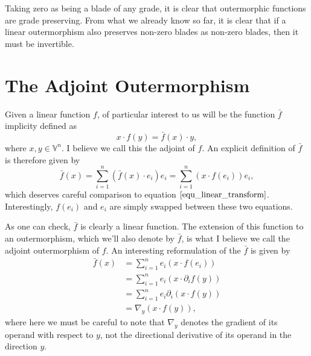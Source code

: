 \documentclass[12pt]{article}
\newcommand{\V}{\mathbb{V}}
\newcommand{\of}{\bar{f}}
\begin{document}
Taking zero as being a blade of any grade, it is clear that outermorphic functions are
grade preserving.  From what we already know so far, it is clear that if a linear outermorphism
also preserves non-zero blades as non-zero blades, then it must be invertible.

\section{The Adjoint Outermorphism}

Given a linear function $f$, of particular
interest to us will be the function $\of$ implicity defined as
\begin{equation*}
x\cdot f(y) = \of(x)\cdot y,
\end{equation*}
where $x,y\in\V^n$.  I believe we call this the adjoint of $f$.
An explicit definition of $\of$ is therefore given by
\begin{equation*}
\of(x) = \sum_{i=1}^n (\of(x)\cdot e_i)e_i = \sum_{i=1}^n (x\cdot f(e_i))e_i,
\end{equation*}
which deserves careful comparison to equation $\eqref{equ_linear_transform}$.  Interestingly,
$f(e_i)$ and $e_i$ are simply swapped between these two equations.

As one can check, $\of$ is clearly a linear function.  The extension of this
function to an outermorphism, which we'll also denote by $\of$, is what
I believe we call the adjoint outermorphism of $f$.  An interesting reformulation
of the $\of$ is given by
\begin{align*}
\of(x) &= \sum_{i=1}^n e_i(x\cdot f(e_i)) \\
 &= \sum_{i=1}^n e_i(x\cdot\partial_i f(y)) \\
 &= \sum_{i=1}^n e_i\partial_i(x\cdot f(y)) \\
 &= \nabla_y(x\cdot f(y)),
\end{align*}
where here we must be careful to note that $\nabla_y$ denotes the gradient of its operand
with respect to $y$, not the directional derivative of its operand in the direction $y$.
\end{document}
